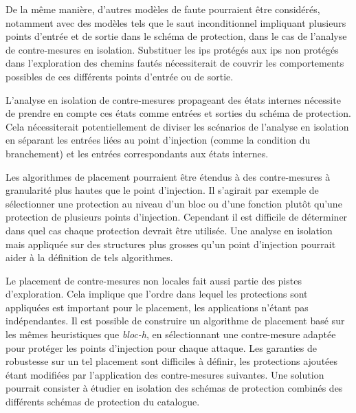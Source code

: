             De la même manière, d'autres modèles de faute pourraient être considérés, notamment avec des modèles tels que le saut inconditionnel impliquant plusieurs points d'entrée et de sortie dans le schéma de protection, dans le cas de l'analyse de contre-mesures en isolation.
            Substituer les \gls{ip}s protégés aux \gls{ip}s non protégés dans l'exploration des chemins fautés nécessiterait de couvrir les comportements possibles de ces différents points d'entrée ou de sortie.

            \begin{sloppypar}
            L'analyse en isolation de contre-mesures propageant des états internes \cite{Oh/TR02, lalande} nécessite de prendre en compte ces états comme entrées et sorties du schéma de protection.
            Cela nécessiterait potentiellement de diviser les scénarios de l'analyse en isolation en séparant les entrées liées au point d'injection (comme la condition du branchement) et les entrées correspondants aux états internes.
            \end{sloppypar}
            
            Les algorithmes de placement pourraient être étendus à des contre-mesures à granularité plus hautes que le point d'injection.
            Il s'agirait par exemple de sélectionner une protection au niveau d'un bloc ou d'une fonction plutôt qu'une protection de plusieurs points d'injection. Cependant il est difficile de déterminer dans quel cas chaque protection devrait être utilisée. Une analyse en isolation mais appliquée sur des structures plus grosses qu'un point d'injection pourrait aider à la définition de tels algorithmes.

            Le placement de contre-mesures non locales fait aussi partie des pistes d'exploration.
            Cela implique que l'ordre dans lequel les protections sont appliquées est important pour le placement, les applications n'étant pas indépendantes.
            Il est possible de construire un algorithme de placement basé sur les mêmes heuristiques que \textit{bloc-h}, en sélectionnant une contre-mesure adaptée pour protéger les points d'injection pour chaque attaque.
            Les garanties de robustesse sur un tel placement sont difficiles à définir, les protections ajoutées étant modifiées par l'application des contre-mesures suivantes.
            Une solution pourrait consister à étudier en isolation des schémas de protection combinés des différents schémas de protection du catalogue. 
            
